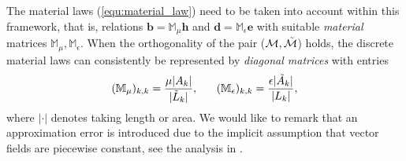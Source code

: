 \documentclass{article}
\begin{document}
The material laws (\ref{equ:material_law}) need to be taken into account within this
framework, that is, relations $\mathbf{b} = \mathbb{M}_\mu \mathbf{h}$ and $\mathbf{d} =
\mathbb{M}_\epsilon \mathbf{e}$ with suitable \emph{material} matrices $\mathbb{M}_\mu,
\mathbb{M}_\epsilon$. When the orthogonality of the pair ($\mathcal{M},
\Tilde{\mathcal{M}}$) holds, the discrete material laws can consistently be represented by
\emph{diagonal matrices} with entries
\begin{equation*}
    (\mathbb{M}_\mu)_{k,k} = \frac{\mu|A_k|}{|\Tilde{L}_k|}, \ \ \ \ \ (\mathbb{M}_\epsilon)_{k,k} = \frac{\epsilon |\Tilde{A}_k|}{|L_k|},
\end{equation*}
where $|\cdot|$ denotes taking length or area. We would like to remark that an
approximation error is introduced due to the implicit assumption that vector fields are
piecewise constant, see the analysis in \cite[][Sec.~3.2]{Marrone_2001}.
\end{document}
